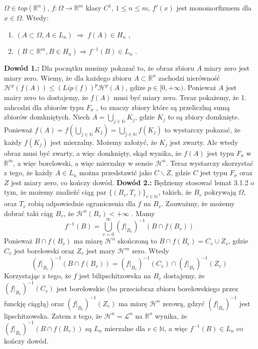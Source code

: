 \begin{tw}
	$\Omega \in top(\mathbb{R}^n)$, $f: \Omega \rightarrow \mathbb{R}^m$ klasy $C^1$, $1 \leq n \leq m$, $f'(x)$ jest monomorfizmem dla $x \in \Omega$. Wtedy:
	\begin{enumerate}	
		\item $(A \subset \Omega, A \in L_n) \; \Longrightarrow \; f(A) \in H_n$ ,
		\item $(B \subset \mathbb{R}^m, B \in H_n) \Longrightarrow f^{-1}(B) \in L_n$ .
	\end{enumerate}

	\textbf{Dowód 1.:}\newline
		Dla początku musimy pokazać to, że obraz zbioru $A$ miary zero jest miary zero. Wiemy, że dla każdego zbioru $A \subset \mathbb{R}^n$ zachodzi nierówność $\mathcal{H}^p(f(A)) \leq (Lip(f))^p \mathcal{H}^p(A)$, gdize $p \in [0, +\infty)$. Ponieważ $A$ jest mairy zero to dostajemy, że $f(A)$ musi być miary zero. 
		Teraz pokażemy, że 1. zahcodzi dla zbiorów typu $F_{\sigma}$ , to znaczy zbiory które są przeliczlną sumą zbiorów domkniętych. Niech $A = \bigcup_{j \in \mathbb{N}} K_j$, gdzie $K_j$ to są zbiory domknięte. Ponieważ $f(A) = f(\bigcup_{j \in \mathbb{N}} K_j) = \bigcup_{j \in \mathbb{N}} f(K_j)$ to wystarczy pokazać, że każdy $f(K_j)$ jest mierzalny. Możemy założyć, że $K_j$ jest zwarty. Ale wtedy obraz musi być zwarty, a więc domknięty, skąd wynika, że $f(A)$ jest typu $F_{\sigma}$ w $\mathbb{R}^m$, a więc borelowski, a więc mierzalny w sensie $\mathcal{H}^n$. 
		Teraz wystarczy skorzystać z tego, że każdy $A \in L_n$ można przedstawić jako $C \backslash Z$, gdzie $C$ jest typu $F_{\sigma}$ oraz $Z$ jest miary zero, co kończy dowód.
	\newline
	\textbf{Dowód 2.:}\newline
		Będziemy stosować lemat 3.1.2 o tym, że możemy znalieźć ciąg par $\{(B_v, T_v)\}_{v \in \mathbb{N}}$, takich, że $B_v$ pokrywają $\Omega$, oraz $T_v$ robią odpowiednie ograniczenia dla $f$ na $B_v$. Zauważmy, że możemy dobrać taki ciąg $B_v$, że $\mathcal{H}^n(B_v) < + \infty$ . Mamy $$ 
			f^{-1}(B) = \bigcup_{v=0}^{\infty} (f|_{B_v})^{-1} (B \cap f(B_v))
		$$
		Ponieważ $B \cap f(B_v)$ ma miarę $\mathcal{H}^n$ skończoną to $B \cap f(B_v) = C_v \cup Z_v$, gdzie $C_v$ jest borelowski oraz $Z_v$ jest mary $\mathcal{H}^m$ zero. Wtedy $$ 
			(f|_{B_v})^{-1}(B \cap f(B_v)) = (f|_{B_v})^{-1}(C_v) \cap (f|_{B_v})^{-1}(Z_v)
		$$
		Korzystając z tego, że $f$ jest bilipschitzowska na $B_v$ dostajemy, że $(f|_{B_v})^{-1}(C_v)$ jest borelowskie (bo przeciobraz zbioru borelowskiego przez funckję ciągłą) oraz $(f|_{B_v})^{-1}(Z_v)$ ma miarę $\mathcal{H}^n$ zerową, gdzyć $(f|_{B_v})^{-1}$ jest lipschitzowska. Zatem z tego, że $\mathcal{H}^n = \mathcal{L}^n$ na $\mathbb{R}^n$ wynika, że $(f|_{B_v})^{-1}(B \cap f(B_v))$ są $L_n$ mierzalne dla $v \in \mathbb{N}$, a więc $f^{-1}(B) \in L_n$ co kończy dowód. 
\end{tw}